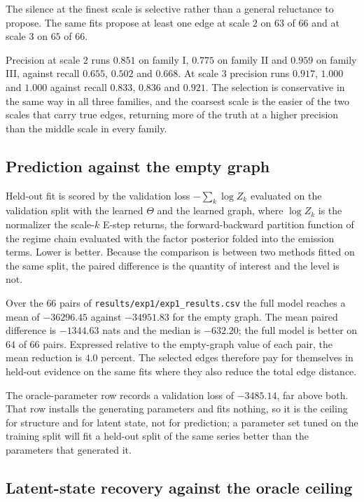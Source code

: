 The silence at the finest scale is selective rather than a general reluctance
to propose. The same fits propose at least one edge at scale $2$ on $63$ of
$66$ and at scale $3$ on $65$ of $66$.

Precision at scale $2$ runs $0.851$ on family I, $0.775$ on family II and
$0.959$ on family III, against recall $0.655$, $0.502$ and $0.668$. At scale
$3$ precision runs $0.917$, $1.000$ and $1.000$ against recall $0.833$, $0.836$
and $0.921$. The selection is conservative in the same way in all three
families, and the coarsest scale is the easier of the two scales that carry
true edges, returning more of the truth at a higher precision than the middle
scale in every family.

\subsection{Prediction against the empty graph}
\label{sec:results:prediction}

Held-out fit is scored by the validation loss $-\sum_k \log Z_k$ evaluated on
the validation split with the learned $\Theta$ and the learned graph, where
$\log Z_k$ is the normalizer the scale-$k$ E-step returns, the forward-backward
partition function of the regime chain evaluated with the factor posterior
folded into the emission terms. Lower is better. Because the comparison is
between two methods fitted on the same split, the paired difference is the
quantity of interest and the level is not.

Over the $66$ pairs of \texttt{results/exp1/exp1\_results.csv} the full model
reaches a mean of $-36296.45$ against $-34951.83$ for the empty graph. The mean
paired difference is $-1344.63$ nats and the median is $-632.20$; the full model
is better on $64$ of $66$ pairs. Expressed relative to the
empty-graph value of each pair, the mean reduction is $4.0$ percent. The
selected edges therefore pay for themselves in held-out evidence on the same
fits where they also reduce the total edge distance.

The oracle-parameter row records a validation loss of $-3485.14$, far above
both. That row installs the generating parameters and fits nothing, so it is
the ceiling for structure and for latent state, not for prediction; a
parameter set tuned on the training split will fit a held-out split of the same
series better than the parameters that generated it.

\subsection{Latent-state recovery against the oracle ceiling}
\label{sec:results:latent}

